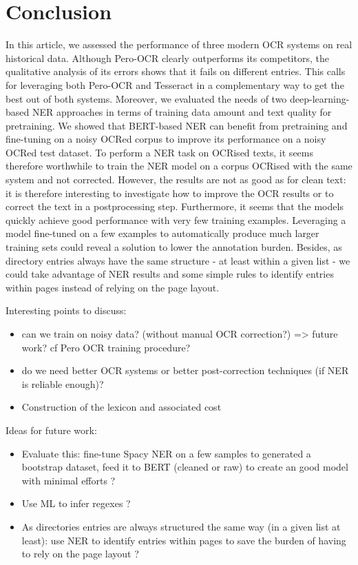 \section{Conclusion}

In this article, we assessed the performance of three modern OCR systems on real historical data. Although Pero-OCR clearly outperforms its competitors, the qualitative analysis of its errors shows that it fails on different entries. This calls for leveraging both Pero-OCR and Tesseract in a complementary way to get the best out of both systems. Moreover, we evaluated the needs of two deep-learning-based NER approaches in terms of training data amount and text quality for pretraining. We showed that BERT-based NER can benefit from pretraining and fine-tuning on a noisy OCRed corpus to improve its performance on a noisy OCRed test dataset. To perform a NER task on OCRised texts, it seems therefore worthwhile to train the NER model on a corpus OCRised with the same system and not corrected. However, the results are not as good as for clean text: it is therefore interesting to investigate how to improve the OCR results or to correct the text in a postprocessing step. Furthermore, it seems that the models quickly achieve good performance with very few training examples. Leveraging a model fine-tuned on a few examples to automatically produce much larger training sets could reveal a solution to lower the annotation burden. Besides, as directory entries always have the same structure - at least within a given list - we could take advantage of NER results and some simple rules to identify entries within pages instead of relying on the page layout.

Interesting points to discuss:
\begin{itemize}
    \item can we train on noisy data? (without manual OCR correction?) => future work? cf Pero OCR training procedure?
    \item do we need better OCR systems or better post-correction techniques (if NER is reliable enough)?
    \item Construction of the lexicon and associated cost 
\end{itemize}

Ideas for future work:
\begin{itemize}
    \item Evaluate this: fine-tune Spacy NER on a few samples to generated a bootstrap dataset, feed it to BERT (cleaned or raw) to create an good model with minimal efforts ? 
    \item Use ML to infer regexes ?
    \item As directories entries are always structured the same way (in a given list at least): use NER to identify entries within pages to save the burden of having to rely on the page layout ?
\end{itemize}